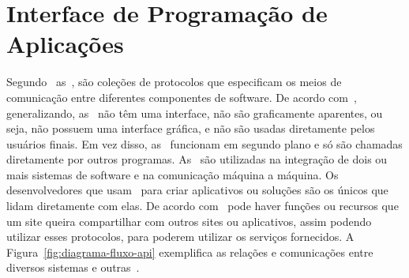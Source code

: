 \section{Interface de Programação de Aplicações}\label{sec:api}

Segundo~\textcite{borgogno2019} as~,
são coleções de protocolos que especificam os meios de comunicação
entre diferentes componentes de software.
De acordo com~\textcite{biehl2015}, generalizando, as~ não
têm uma interface, não são graficamente aparentes, ou seja, não possuem uma
interface gráfica, e não são usadas diretamente pelos usuários finais.
Em vez disso, as~ funcionam em segundo plano e só são chamadas
diretamente por outros programas.
As~ são utilizadas na integração de dois ou mais sistemas de
software e na comunicação máquina a máquina.
Os desenvolvedores que usam~ para criar aplicativos ou
soluções são os únicos que lidam diretamente com elas.
De acordo com~\textcite{russel2019} pode haver funções ou recursos que um
site queira compartilhar com outros sites ou aplicativos, assim podendo
utilizar esses protocolos, para poderem utilizar os serviços fornecidos.
A Figura~\ref{fig:diagrama-fluxo-api} exemplifica as relações e
comunicações entre diversos sistemas e outras~.

